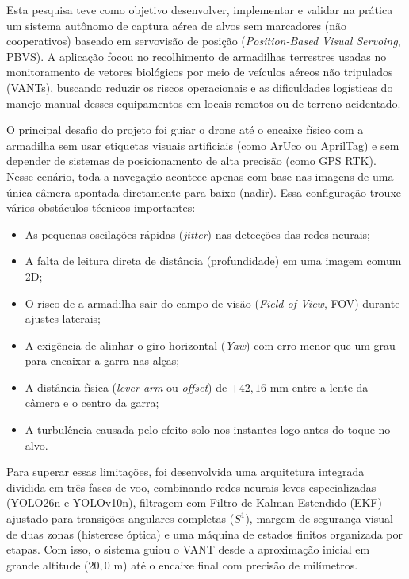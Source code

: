 
Esta pesquisa teve como objetivo desenvolver, implementar e validar na prática um sistema autônomo de captura aérea de alvos sem marcadores (não cooperativos) baseado em servovisão de posição (\textit{Position-Based Visual Servoing}, PBVS). A aplicação focou no recolhimento de armadilhas terrestres usadas no monitoramento de vetores biológicos por meio de veículos aéreos não tripulados (VANTs), buscando reduzir os riscos operacionais e as dificuldades logísticas do manejo manual desses equipamentos em locais remotos ou de terreno acidentado.

O principal desafio do projeto foi guiar o drone até o encaixe físico com a armadilha sem usar etiquetas visuais artificiais (como ArUco ou AprilTag) e sem depender de sistemas de posicionamento de alta precisão (como GPS RTK). Nesse cenário, toda a navegação acontece apenas com base nas imagens de uma única câmera apontada diretamente para baixo (nadir). Essa configuração trouxe vários obstáculos técnicos importantes: 

\begin{itemize}
	\item As pequenas oscilações rápidas (\textit{jitter}) nas detecções das redes neurais; 
	\item A falta de leitura direta de distância (profundidade) em uma imagem comum 2D; 
	\item O risco de a armadilha sair do campo de visão (\textit{Field of View}, FOV) durante ajustes laterais; 
	\item A exigência de alinhar o giro horizontal (\textit{Yaw}) com erro menor que um grau para encaixar a garra nas alças; 
	\item A distância física (\textit{lever-arm} ou \textit{offset}) de $+42,16\text{ mm}$ entre a lente da câmera e o centro da garra;
	\item A turbulência causada pelo efeito solo nos instantes logo antes do toque no alvo.
\end{itemize}

Para superar essas limitações, foi desenvolvida uma arquitetura integrada dividida em três fases de voo, combinando redes neurais leves especializadas (YOLO26n e YOLOv10n), filtragem com Filtro de Kalman Estendido (EKF) ajustado para transições angulares completas ($S^1$), margem de segurança visual de duas zonas (histerese óptica) e uma máquina de estados finitos organizada por etapas. Com isso, o sistema guiou o VANT desde a aproximação inicial em grande altitude ($20,0\text{ m}$) até o encaixe final com precisão de milímetros.

